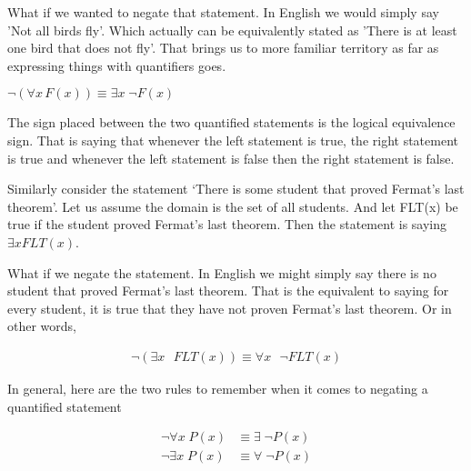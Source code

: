\documentclass[12pt]{article}
\begin{document}
What if we wanted to negate that statement. In English we would simply say 'Not all birds fly'. Which actually can be equivalently stated as 'There is at least one bird that does not fly'. That brings us to more familiar territory as far as expressing things with quantifiers goes. 

$\neg (\forall x \, F(x)) \equiv \exists x \; \neg F(x)$

The sign placed between the two quantified statements is the logical equivalence sign. That is saying that whenever the left statement is true, the right statement is true and whenever the left statement is false then the right statement is false. 

Similarly consider the statement `There is some student that proved Fermat's last theorem'. Let us assume the domain is the set of all students. And let FLT(x) be true if the student proved Fermat's last theorem. Then the statement is saying $\exists x FLT(x)$. 

What if we negate the statement. In English we might simply say there is no student that proved Fermat's last theorem. That is the equivalent to saying for every student, it is true that they have not proven Fermat's last theorem. Or in other words, 

\begin{align*}
\neg (\exists x \text{ } FLT(x)) \equiv \forall x \text{ } \neg FLT(x)
\end{align*}


In general, here are the two rules to remember when it comes to negating a quantified statement

\begin{align*}
\neg \forall x \; P(x) &\equiv \exists \; \neg P(x) \\
\neg \exists x \; P(x) &\equiv \forall \; \neg P(x)
\end{align*}
\end{document}
